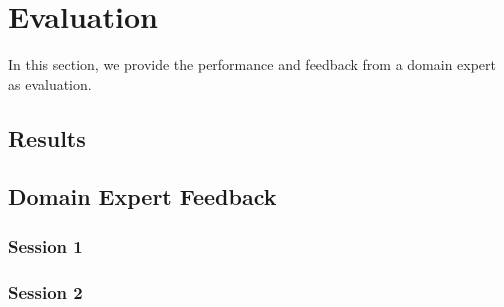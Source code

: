 \clearpage
\section{Evaluation}
In this section, we provide the performance and feedback from a domain expert as evaluation.

\subsection{Results}

\subsection{Domain Expert Feedback}

\subsubsection{Session 1}

\subsubsection{Session 2}